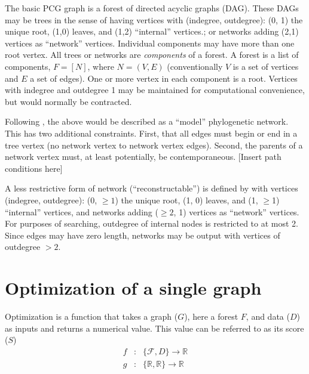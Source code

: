 \documentclass[11pt]{article}
\begin{document}
The basic PCG graph is a forest of directed acyclic graphs (DAG). 
These DAGs may be trees in the sense of having vertices with (indegree, outdegree): (0, 1) the unique root, (1,0) leaves, and (1,2) ``internal'' vertices.; or networks adding (2,1) vertices as ``network'' vertices.
Individual components may have more than one root vertex.
All trees or networks are \textit{components} of a forest. 
A forest is a list of components, $F = [N]$, where $N = (V, E)$ (conventionally $V$ is a set of vertices and $E$ a set of edges).
One or more vertex in each component is a root. 
Vertices with indegree and outdegree 1 may be maintained for computational convenience, but would normally be contracted.
 
Following \cite{moretetal2004}, the above would be described as a ``model'' phylogenetic network.
This has two additional constraints.
First, that all edges must begin or end in a tree vertex (no network vertex to network vertex edges).  
Second,  the parents of a network vertex must, at least potentially, be contemporaneous. 
[Insert path conditions here]  
 
A less restrictive form of network (``reconstructable'') is defined by \cite{moretetal2004} with vertices (indegree, outdegree): 
(0, $\ge 1$) the unique root, (1, 0) leaves, and (1, $\ge$1) ``internal'' vertices, and networks adding ($\ge 2$, 1) vertices as ``network'' vertices.  For purposes of searching, outdegree of internal nodes is restricted to at most 2. Since edges may have zero length, networks may be output with vertices of outdegree $> 2$.
 
\section{Optimization of a single graph}\label{Optimization of a single graph}

Optimization is a function that takes a graph ($G$), here a forest $F$, and data ($D$) as inputs and returns a numerical value.  
This value can be referred to as its score ($S$)
 	\begin{eqnarray*}
 		f & : &  \{\mathcal{F}, D\} \rightarrow \mathbb{R}\\
		g & : & \{  \mathbb{R},  \mathbb{R} \} \rightarrow \mathbb{R}
	 \end{eqnarray*}
 

\newpage
\singlespacing

%


%
\end{document}
